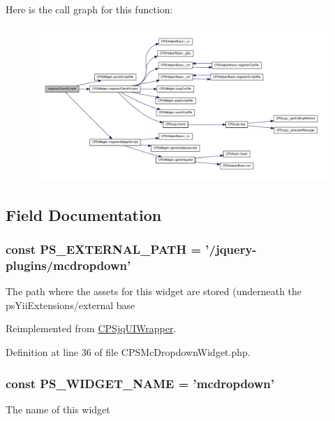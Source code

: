Here is the call graph for this function:\nopagebreak
\begin{figure}[H]
\begin{center}
\leavevmode
\includegraphics[width=400pt]{classCPSMcDropdownWidget_ac02a66bde8e72e4909137bf748edf665_cgraph}
\end{center}
\end{figure}




\subsection{Field Documentation}
\hypertarget{classCPSMcDropdownWidget_a8ccb5e1d65c091f944a6aa8c5be834ca}{
\subsubsection[{PS\_\-EXTERNAL\_\-PATH}]{\setlength{\rightskip}{0pt plus 5cm}const {\bf PS\_\-EXTERNAL\_\-PATH} = '/jquery-\/plugins/mcdropdown'}}
\label{classCPSMcDropdownWidget_a8ccb5e1d65c091f944a6aa8c5be834ca}
The path where the assets for this widget are stored (underneath the psYiiExtensions/external base 

Reimplemented from \hyperlink{classCPSjqUIWrapper_a8ccb5e1d65c091f944a6aa8c5be834ca}{CPSjqUIWrapper}.



Definition at line 36 of file CPSMcDropdownWidget.php.

\hypertarget{classCPSMcDropdownWidget_ae357f9dc377f7de0d12010b2ced28cbc}{
\subsubsection[{PS\_\-WIDGET\_\-NAME}]{\setlength{\rightskip}{0pt plus 5cm}const {\bf PS\_\-WIDGET\_\-NAME} = 'mcdropdown'}}
\label{classCPSMcDropdownWidget_ae357f9dc377f7de0d12010b2ced28cbc}
The name of this widget 

